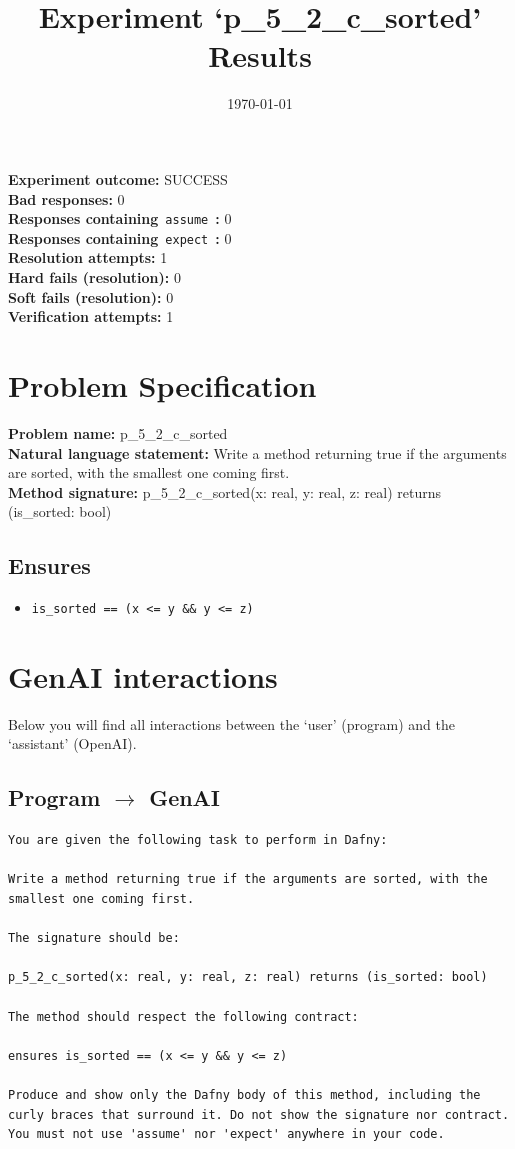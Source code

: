\documentclass{article}
\begin{document}
\title{Experiment `p\_5\_2\_c\_sorted' Results}
\author{\today}
\date{}
\maketitle
\textbf{Experiment outcome: }SUCCESS
\\\textbf{Bad responses: }0
\\\textbf{Responses containing}~\texttt{assume}~\textbf{: }0
\\\textbf{Responses containing}~\texttt{expect}~\textbf{: }0
\\\textbf{Resolution attempts: }1
\\\textbf{Hard fails (resolution): }0
\\\textbf{Soft fails (resolution): }0
\\\textbf{Verification attempts: }1
\section*{Problem Specification}
\textbf{Problem name: }p\_5\_2\_c\_sorted
\\\textbf{Natural language statement: }Write a method returning true if the arguments are sorted, with the smallest one coming first.
\\\textbf{Method signature: }p\_5\_2\_c\_sorted(x: real, y: real, z: real) returns (is\_sorted: bool)
\subsection*{Ensures}
\begin{itemize}
\item \texttt{is\_sorted == (x <= y \&\& y <= z)}
\end{itemize}
\clearpage
\section*{GenAI interactions}
Below you will find all interactions between the `user' (program) and the `assistant' (OpenAI).
\subsection*{Program $\rightarrow$ GenAI}
\begin{lstlisting}
You are given the following task to perform in Dafny:

Write a method returning true if the arguments are sorted, with the smallest one coming first.

The signature should be:

p_5_2_c_sorted(x: real, y: real, z: real) returns (is_sorted: bool)

The method should respect the following contract:

ensures is_sorted == (x <= y && y <= z)

Produce and show only the Dafny body of this method, including the curly braces that surround it. Do not show the signature nor contract. You must not use 'assume' nor 'expect' anywhere in your code.
\end{lstlisting}
\end{document}
